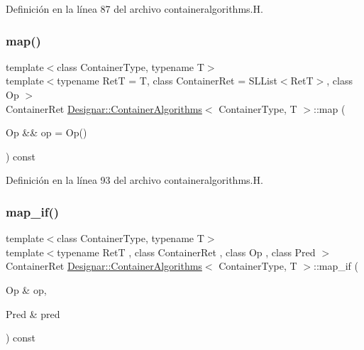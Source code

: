 Definición en la línea 87 del archivo containeralgorithms.\+H.

\mbox{\label{class_designar_1_1_container_algorithms_a9c49c11af28a3093dd133b65a115853b}} 
\subsubsection{\texorpdfstring{map()}{map()}\hspace{0.1cm}{\footnotesize\ttfamily [2/2]}}
{\footnotesize\ttfamily template$<$class Container\+Type, typename T$>$ \\
template$<$typename RetT  = T, class Container\+Ret  = S\+L\+List$<$\+Ret\+T$>$, class Op $>$ \\
Container\+Ret \hyperlink{class_designar_1_1_container_algorithms}{Designar\+::\+Container\+Algorithms}$<$ Container\+Type, T $>$\+::map (\begin{DoxyParamCaption}\item[{Op \&\&}]{op = {\ttfamily Op()} }\end{DoxyParamCaption}) const\hspace{0.3cm}{\ttfamily [inline]}}



Definición en la línea 93 del archivo containeralgorithms.\+H.

\mbox{\label{class_designar_1_1_container_algorithms_a9209d9ddf0b4dd85301735c99bcdb171}} 
\subsubsection{\texorpdfstring{map\+\_\+if()}{map\_if()}\hspace{0.1cm}{\footnotesize\ttfamily [1/4]}}
{\footnotesize\ttfamily template$<$class Container\+Type, typename T$>$ \\
template$<$typename RetT , class Container\+Ret , class Op , class Pred $>$ \\
Container\+Ret \hyperlink{class_designar_1_1_container_algorithms}{Designar\+::\+Container\+Algorithms}$<$ Container\+Type, T $>$\+::map\+\_\+if (\begin{DoxyParamCaption}\item[{Op \&}]{op,  }\item[{Pred \&}]{pred }\end{DoxyParamCaption}) const\hspace{0.3cm}{\ttfamily [inline]}}



